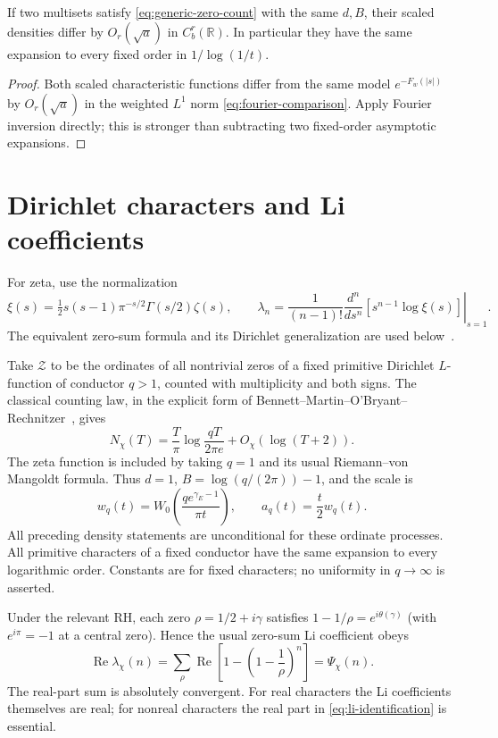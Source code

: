 \begin{corollary}
If two multisets satisfy \eqref{eq:generic-zero-count} with the same
$d,B$, their scaled densities differ by $O_r(\sqrt a)$ in
$C_b^r(\mathbb R)$. In particular they have the same expansion to every
fixed order in $1/\log(1/t)$.
\end{corollary}

\begin{proof}
Both scaled characteristic functions differ from the same model
$e^{-F_w(|s|)}$ by $O_r(\sqrt a)$ in the weighted $L^1$ norm
\eqref{eq:fourier-comparison}. Apply Fourier inversion directly; this
is stronger than subtracting two fixed-order asymptotic expansions.
\end{proof}

\section{Dirichlet characters and Li coefficients}

For zeta, use the normalization
\[\xi(s)=\tfrac12s(s-1)\pi^{-s/2}\Gamma(s/2)\zeta(s),\qquad
\lambda_n=\frac1{(n-1)!}\left.\frac{d^n}{ds^n}
[s^{n-1}\log\xi(s)]\right|_{s=1}.\]
The equivalent zero-sum formula and its Dirichlet generalization
are used below~\cite{Li1997,BombieriLagarias,Lagarias2007}.

Take $\mathcal Z$ to be the ordinates of all nontrivial zeros of a fixed
primitive Dirichlet $L$-function of conductor $q>1$, counted with
multiplicity and both signs. The classical counting law, in the explicit
form of Bennett--Martin--O'Bryant--Rechnitzer~\cite{BMOR2021}, gives
\[
 N_\chi(T)=\frac T\pi\log\frac{qT}{2\pi e}
              +O_\chi(\log(T+2)).
\]
The zeta function is included by taking $q=1$ and its usual
Riemann--von Mangoldt formula. Thus $d=1$,
$B=\log(q/(2\pi))-1$, and the scale is
\begin{equation}\label{eq:dirichlet-scale}
 w_q(t)=W_0\left(\frac{q e^{\gamma_{\!E}-1}}{\pi t}\right),
 \qquad a_q(t)=\frac t2 w_q(t).
\end{equation}
All preceding density statements are unconditional for these ordinate
processes. All primitive characters of a fixed conductor have the same
expansion to every logarithmic order. Constants are for fixed characters;
no uniformity in $q\to\infty$ is asserted.

Under the relevant RH, each zero $\rho=1/2+i\gamma$ satisfies
$1-1/\rho=e^{i\theta(\gamma)}$ (with $e^{i\pi}=-1$ at a central
zero). Hence the usual zero-sum Li coefficient obeys
\begin{equation}\label{eq:li-identification}
 \operatorname{Re}\lambda_\chi(n)
 =\sum_\rho\operatorname{Re}
       \left[1-\left(1-\frac1\rho\right)^n\right]
 =\Psi_\chi(n).
\end{equation}
The real-part sum is absolutely convergent. For real characters the Li
coefficients themselves are real; for nonreal characters the real part
in \eqref{eq:li-identification} is essential.

